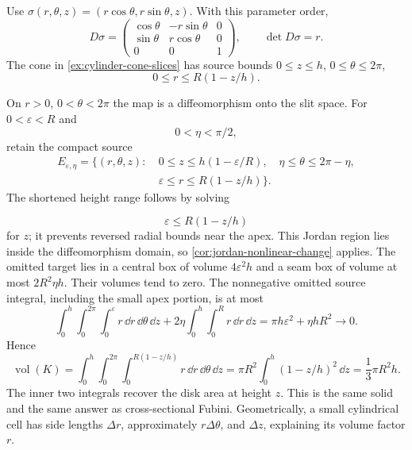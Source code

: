 \begin{example}
Use $\sigma(r,\theta,z)=(r\cos\theta,r\sin\theta,z)$. With this parameter order,
\[
D\sigma=\begin{pmatrix}\cos\theta&-r\sin\theta&0\\
\sin\theta&r\cos\theta&0\\0&0&1\end{pmatrix},\qquad \det D\sigma=r.
\]
The cone in \cref{ex:cylinder-cone-slices} has source bounds
$0\leq z\leq h$, $0\leq\theta\leq2\pi$,
\[
0\leq r\leq R(1-z/h).
\]

On $r>0$, $0<\theta<2\pi$ the map is a diffeomorphism onto the slit
space. For $0<\varepsilon<R$ and
\[
0<\eta<\pi/2,
\]
 retain the compact source
\[
\begin{split}
E_{\varepsilon,\eta}=\{(r,\theta,z):\ &0\leq z\leq h(1-\varepsilon/R),\quad
\eta\leq\theta\leq2\pi-\eta,\\
&\varepsilon\leq r\leq R(1-z/h)\}.
\end{split}
\]
The shortened height range follows by solving

\[
\varepsilon\leq R(1-z/h)
\]
 for $z$; it prevents reversed radial bounds near
the apex. This Jordan region lies inside the diffeomorphism domain, so
\cref{cor:jordan-nonlinear-change} applies. The omitted target lies in a
central box of volume $4\varepsilon^2h$ and a seam box of volume at most
$2R^2\eta h$. Their volumes tend to zero. The nonnegative omitted source
integral, including the small apex portion, is at most
\[
\int_0^h\int_0^{2\pi}\int_0^\varepsilon r\,\dd r\,\dd\theta\,\dd z
+2\eta\int_0^h\int_0^R r\,\dd r\,\dd z
=\pi h\varepsilon^2+\eta hR^2\longrightarrow0.
\]
Hence
\[
\operatorname{vol}(K)=\int_0^h\int_0^{2\pi}
\int_0^{R(1-z/h)}r\,\dd r\,\dd\theta\,\dd z
=\pi R^2\int_0^h(1-z/h)^2\,\dd z=\frac13\pi R^2h.
\]
The inner two integrals recover the disk area at height $z$. This is the
same solid and the same answer as cross-sectional Fubini. Geometrically,
a small cylindrical cell has side lengths $\Delta r$, approximately
$r\Delta\theta$, and $\Delta z$, explaining its volume factor $r$.
\end{example}
